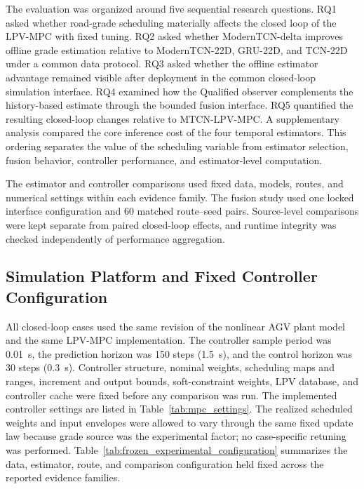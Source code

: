 \documentclass{ieeeaccess}
\begin{document}
The evaluation was organized around five sequential research questions. RQ1 asked whether road-grade scheduling materially affects the closed loop of the LPV-MPC with fixed tuning. RQ2 asked whether ModernTCN-delta improves offline grade estimation relative to ModernTCN-22D, GRU-22D, and TCN-22D under a common data protocol. RQ3 asked whether the offline estimator advantage remained visible after deployment in the common closed-loop simulation interface. RQ4 examined how the Qualified observer complements the history-based estimate through the bounded fusion interface. RQ5 quantified the resulting closed-loop changes relative to MTCN-LPV-MPC. A supplementary analysis compared the core inference cost of the four temporal estimators. This ordering separates the value of the scheduling variable from estimator selection, fusion behavior, controller performance, and estimator-level computation.

The estimator and controller comparisons used fixed data, models, routes, and numerical settings within each evidence family. The fusion study used one locked interface configuration and 60 matched route--seed pairs. Source-level comparisons were kept separate from paired closed-loop effects, and runtime integrity was checked independently of performance aggregation.

\subsection{Simulation Platform and Fixed Controller Configuration}

All closed-loop cases used the same revision of the nonlinear AGV plant model and the same LPV-MPC implementation. The controller sample period was 0.01~s, the prediction horizon was 150 steps (1.5~s), and the control horizon was 30 steps (0.3~s). Controller structure, nominal weights, scheduling maps and ranges, increment and output bounds, soft-constraint weights, LPV database, and controller cache were fixed before any comparison was run. The implemented controller settings are listed in Table~\ref{tab:mpc_settings}. The realized scheduled weights and input envelopes were allowed to vary through the same fixed update law because grade source was the experimental factor; no case-specific retuning was performed. Table~\ref{tab:frozen_experimental_configuration} summarizes the data, estimator, route, and comparison configuration held fixed across the reported evidence families.
\end{document}
